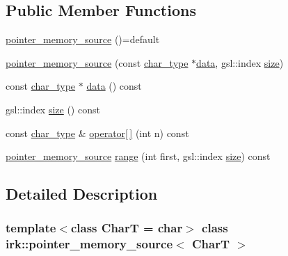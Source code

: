 \subsection*{Public Member Functions}
\begin{DoxyCompactItemize}
\item 
\mbox{\hyperlink{classirk_1_1pointer__memory__source_a30f9b1ac20116068b5e9daf8597f4f4b}{pointer\+\_\+memory\+\_\+source}} ()=default
\item 
\mbox{\hyperlink{classirk_1_1pointer__memory__source_a37313e3f5f00570dbe685b9dfe5053f4}{pointer\+\_\+memory\+\_\+source}} (const \mbox{\hyperlink{classirk_1_1pointer__memory__source_a4b778df8efee229fdafbd4de413dbf61}{char\+\_\+type}} $\ast$\mbox{\hyperlink{classirk_1_1pointer__memory__source_a563d794f484d7e6812714e4fe23bcd08}{data}}, gsl\+::index \mbox{\hyperlink{classirk_1_1pointer__memory__source_abacd920a55db430eba44122a4771b0bd}{size}})
\item 
const \mbox{\hyperlink{classirk_1_1pointer__memory__source_a4b778df8efee229fdafbd4de413dbf61}{char\+\_\+type}} $\ast$ \mbox{\hyperlink{classirk_1_1pointer__memory__source_a563d794f484d7e6812714e4fe23bcd08}{data}} () const
\item 
gsl\+::index \mbox{\hyperlink{classirk_1_1pointer__memory__source_abacd920a55db430eba44122a4771b0bd}{size}} () const
\item 
const \mbox{\hyperlink{classirk_1_1pointer__memory__source_a4b778df8efee229fdafbd4de413dbf61}{char\+\_\+type}} \& \mbox{\hyperlink{classirk_1_1pointer__memory__source_a8571616fa6e13d6f7330bf6b25a47d72}{operator\mbox{[}$\,$\mbox{]}}} (int n) const
\item 
\mbox{\hyperlink{classirk_1_1pointer__memory__source}{pointer\+\_\+memory\+\_\+source}} \mbox{\hyperlink{classirk_1_1pointer__memory__source_a0319e9ddcf38ea514b26c20cd41a7ec5}{range}} (int first, gsl\+::index \mbox{\hyperlink{classirk_1_1pointer__memory__source_abacd920a55db430eba44122a4771b0bd}{size}}) const
\end{DoxyCompactItemize}


\subsection{Detailed Description}
\subsubsection*{template$<$class CharT = char$>$\newline
class irk\+::pointer\+\_\+memory\+\_\+source$<$ Char\+T $>$}

